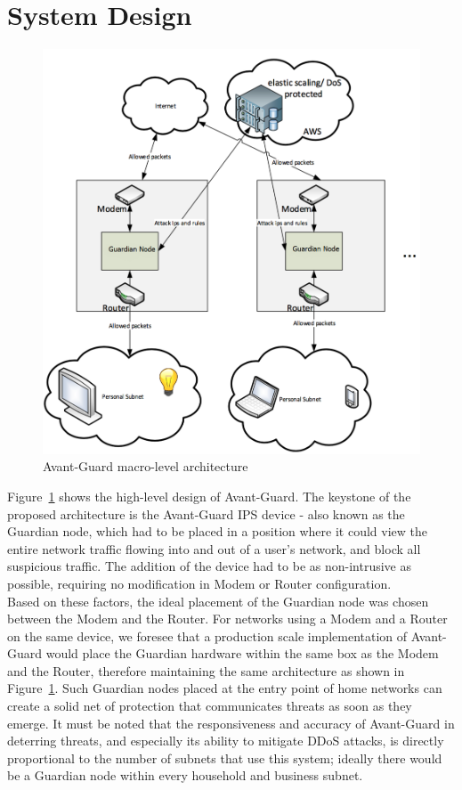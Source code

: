 \section{System Design}

\begin{figure}
    \centering
    \includegraphics[width=0.95\linewidth]{figs/macro.png}
    \caption{Avant-Guard macro-level architecture}
    \label{fig:macro}
\end{figure}


\label{sec:design}

Figure~\ref{fig:macro} shows the high-level design of Avant-Guard. The keystone of the proposed architecture is the Avant-Guard IPS device - also known as the Guardian node, which had to be placed in a position where it could view the entire network traffic flowing into and out of a user's network, and block all suspicious traffic. The addition of the device had to be as non-intrusive as possible, requiring no modification in Modem or Router configuration. \\

Based on these factors, the ideal placement of the Guardian node was chosen between the Modem and the Router. For networks using a Modem and a Router on the same device, we foresee that a production scale implementation of Avant-Guard would place the Guardian hardware within the same box as the Modem and the Router, therefore maintaining the same architecture as shown in Figure~\ref{fig:macro}. Such Guardian nodes placed at the entry point of home networks can create a solid net of protection that communicates threats as soon as they emerge. It must be noted that the responsiveness and accuracy of Avant-Guard in deterring threats, and especially its ability to mitigate DDoS attacks, is directly proportional to the number of subnets that use this system; ideally there would be a Guardian node within every household and business subnet.

